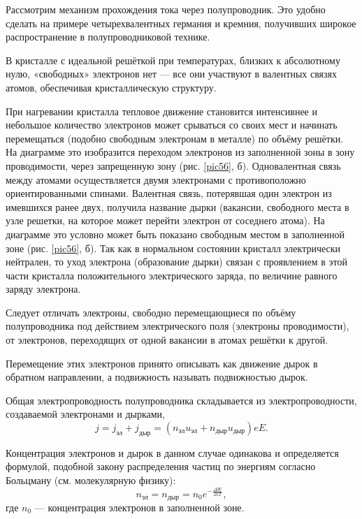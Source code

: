 \documentclass[a4paper,10pt]{book}
\begin{document}
Рассмотрим механизм прохождения тока через полупроводник. Это удобно сделать на примере четырехвалентных германия и кремния, получивших широкое распространение в полупроводниковой технике.

В кристалле с идеальной решёткой при температурах, близких к абсолютному нулю, «свободных» электронов нет — все они участвуют в валентных связях атомов, обеспечивая кристаллическую структуру.

При нагревании кристалла тепловое движение становится интенсивнее и небольшое количество электронов может срываться со  своих мест и начинать перемещаться (подобно свободным электронам в металле) по объёму решётки. На диаграмме это изобразится переходом электронов из заполненной зоны в зону проводимости, через запрещенную зону (рис. \ref{pic56}, $\textit{б}$). Одновалентная связь между атомами осуществляется двумя электронами с противоположно  ориентированными спинами. Валентная связь, потерявшая один электрон из имевшихся ранее двух, получила название дырки (вакансии, свободного места в узле решетки, на которое может перейти электрон от соседнего атома). На диаграмме это условно может быть показано свободным местом в заполненной зоне  (рис. \ref{pic56}, $\textit{б}$). Так как в нормальном состоянии кристалл электрически нейтрален, то уход электрона (образование дырки) связан с проявлением в этой части кристалла положительного электрического заряда, по величине равного заряду электрона.

Следует отличать электроны, свободно перемещающиеся по объёму полупроводника под действием электрического поля (электроны проводимости), от электронов, переходящих от одной вакансии в атомах решётки к другой.

Перемещение этих электронов принято описывать как движение дырок в обратном направлении, а подвижность называть подвижностью дырок.

Общая электропроводность полупроводника складывается из электропроводности, создаваемой электронами и дырками,\begin{equation}\label{25.2}
j = j_{\text{эл}} + j_{\text{дыр}} = (n_{\text{эл}}u_{\text{эл}} + n_{\text{дыр}}u_{\text{дыр}})eE.
\end{equation}

Концентрация электронов и дырок в данном случае одинакова и определяется формулой, подобной закону распределения частиц по энергиям согласно Больцману (см. молекулярную физику):
\begin{equation}\label{25.3}
n_{\text{эл}} = n_{\text{дыр}} =  n_0 e^{-\frac{\Delta W}{2kT}},
\end{equation}
где $n_0$ — концентрация электронов в заполненной зоне.
\end{document}
